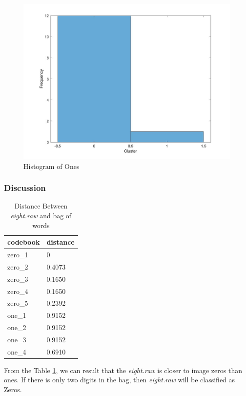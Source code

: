 \documentclass[11pt]{article}
\begin{document}
\begin{figure}[!htp]
	\centering
	\includegraphics[scale=0.3]{histo_1.jpg}
	\caption{ Histogram of Ones}
	\label{histo_0}
	\end{figure}
	

	
\subsubsection{Discussion}

\begin{table}[!htp]
	\centering
	\caption{ Distance Between {\it eight.raw} and bag of words}
	\begin{tabular}{|l|l|}
	\hline
	codebook & distance \\ \hline
	zero\_1  & 0        \\ \hline
	zero\_2  & 0.4073   \\ \hline
	zero\_3  & 0.1650   \\ \hline
	zero\_4  & 0.1650   \\ \hline
	zero\_5  & 0.2392   \\ \hline
	one\_1   & 0.9152   \\ \hline
	one\_2   & 0.9152   \\ \hline
	one\_3   & 0.9152   \\ \hline
	one\_4   & 0.6910   \\ \hline
	\end{tabular}
	\label{dist}
	\end{table}
	
From the Table \ref{dist}, we can result that the {\it eight.raw} is closer to image zeros than ones. If there is only two digits in the bag, then {\it eight.raw} will be classified as Zeros.
\end{document}
